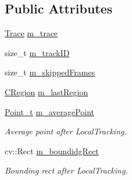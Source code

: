 \subsection*{Public Attributes}
\begin{DoxyCompactItemize}
\item 
\mbox{\hyperlink{class_trace}{Trace}} \mbox{\hyperlink{class_c_track_adf88ff8678ec928ac3ca764f7308b96f}{m\+\_\+trace}}
\item 
size\+\_\+t \mbox{\hyperlink{class_c_track_a8aae01d68f5a1a6c0292476ea19c89f9}{m\+\_\+track\+ID}}
\item 
size\+\_\+t \mbox{\hyperlink{class_c_track_a3308a34b70a90692b0fb863eb621bd37}{m\+\_\+skipped\+Frames}}
\item 
\mbox{\hyperlink{class_c_region}{C\+Region}} \mbox{\hyperlink{class_c_track_a5af91fbfad7ebf07bd0f681f915e440c}{m\+\_\+last\+Region}}
\item 
\mbox{\hyperlink{defines_8h_a8c42696da8f098b91374a8e8bb84b430}{Point\+\_\+t}} \mbox{\hyperlink{class_c_track_a4e569da5601959c866c4e62638c8c088}{m\+\_\+average\+Point}}
\begin{DoxyCompactList}\small\item\em Average point after Local\+Tracking. \end{DoxyCompactList}\item 
cv\+::\+Rect \mbox{\hyperlink{class_c_track_a1d15e2cbc31754f60f6bbe30f218d0a4}{m\+\_\+boundidg\+Rect}}
\begin{DoxyCompactList}\small\item\em Bounding rect after Local\+Tracking. \end{DoxyCompactList}\end{DoxyCompactItemize}
